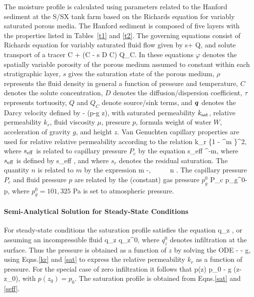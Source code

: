 The moisture profile is calculated using parameters related to the Hanford sediment at the S/SX tank farm based on the Richards equation for variably saturated porous media. The Hanford sediment is composed of five layers with the properties listed in Tables~\ref{t1} and \ref{t2}. The governing equations consist of Richards equation for variably saturated fluid flow given by
\EQ
{} \varphi s\rho + \bnabla\cdot\bq\rho \eq Q,
\EN
and solute transport of a tracer
\EQ
{}\varphi C + \bnabla\cdot\big(\bq C - \varphi s \tau D \bnabla C\big) \eq Q_C.
\EN
In these equations $\varphi$ denotes the spatially variable porosity of the porous medium assumed to constant within each stratigraphic layer, $s$ gives the saturation state of the porous medium, $\rho$ represents the fluid density in general a function of pressure and temperature, $C$ denotes the solute concentration, $D$ denotes the diffusion/dispersion coefficient, $\tau$ represents tortuosity, $Q$ and $Q_C$ denote source/sink terms, and $\boldsymbol{q}$ denotes the Darcy velocity defined by
\EQ
\bq\eq -  \bnabla (p-\rho g z),
\EN
with saturated permeability $k_{\rm sat}$, relative permeability $k_r$, fluid viscosity $\mu$, pressure $p$, formula weight of water $W$, acceleration of gravity $g$, and height $z$. Van Genuchten capillary properties are used for relative relative permeability according to the relation
\EQ\label{kr}
k_{r} \eq {} \left\{1 - ^m \right\}^2, 
\EN
where $s_{\rm eff}$ is related to capillary pressure $P_c$ by the equation
\EQ\label{sat}
s_{\rm eff} \eq {}^{-m}, 
\EN 
where $s_{\rm 
eff}$ is defined by 
\EQ\label{seff1}
s_{\rm eff} \eq {}, 
\EN 
and where $s_r$ denotes the residual saturation. The quantity $n$ is related to $m$ by the expression 
\EQ\label{lambda} 
m -, \ \ \ \ \ n \eq {}. 
\EN 
The capillary pressure $P_c$ and fluid pressure $p$ are related by the (constant) gas pressure $p_g^0$
\EQ
P_c \eq p_g^0-p,
\EN
where $p_g^0 \!=\! 101,325$ Pa is set to atmospheric pressure.

\paragraph{Semi-Analytical Solution for Steady-State Conditions}

For steady-state conditions the saturation profile satisfies the equation
\EQ
{} \rho q_z ,
\EN
or assuming an incompressible fluid
\EQ
q_z \eq q_z^0,
\EN
where $q_z^0$ denotes infiltration at the surface. Thus the pressure is obtained as a function of $z$ by solving the ODE
\EQ\label{dpdz}
 \eq - - \rho g,
\EN
using Eqns.\eqref{kr} and \eqref{sat} to express the relative permeability $k_r$ as a function of pressure. For the special case of zero infiltration it follows that
\EQ
p(z) \eq p_0 - \rho g (z-z_0),
\EN
with $p(z_0)\!=\!p_0$. The saturation profile is obtained from Eqns.\eqref{sat} and \eqref{seff}.

